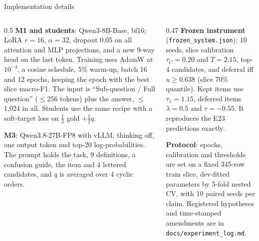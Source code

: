 \begin{frame}{Implementation details}
  \footnotesize
  \begin{columns}[T,onlytextwidth]
    \begin{column}{0.5\textwidth}
      \textbf{M1 and students}: Qwen3-8B-Base, bf16; LoRA $r = 16$, $\alpha = 32$, dropout 0.05 on all attention and MLP projections, and a new 9-way head on the last token. Training uses AdamW at $10^{-4}$, a cosine schedule, 5\% warm-up, batch 16 and 12 epochs, keeping the epoch with the best slice macro-F1. The input is ``Sub-question / Full question'' ($\le$256 tokens) plus the answer, $\le$1,024 in all. Students use the same recipe with a soft-target loss on $\tfrac12$ gold $+ \tfrac12 q$.
      \vspace{2mm}

      \textbf{M3}: Qwen3.8-27B-FP8 with vLLM, thinking off, one output token and top-20 log-probabilities. The prompt holds the task, 9 definitions, a confusion guide, the item and 4 lettered candidates, and $q$ is averaged over 4 cyclic orders.
    \end{column}
    \begin{column}{0.47\textwidth}
      \textbf{Frozen instrument} (\texttt{frozen\_system.json}): 10 seeds, slice calibration $\tau_C = 0.20$ and $T = 2.15$, top-4 candidates, and deferral iff $u \ge 0.638$ (slice 70\% quantile). Kept items use $\tau_1 = 1.15$, deferred items $\lambda = 0.5$ and $\tau = -0.55$. It reproduces the E23 predictions exactly.
      \vspace{2mm}

      \textbf{Protocol}: epochs, calibration and thresholds are set on a fixed 345-row train slice, dev-fitted parameters by 5-fold nested CV, with 10 paired seeds per claim. Registered hypotheses and time-stamped amendments are in \texttt{docs/experiment\_log.md}.
    \end{column}
  \end{columns}
\end{frame}
